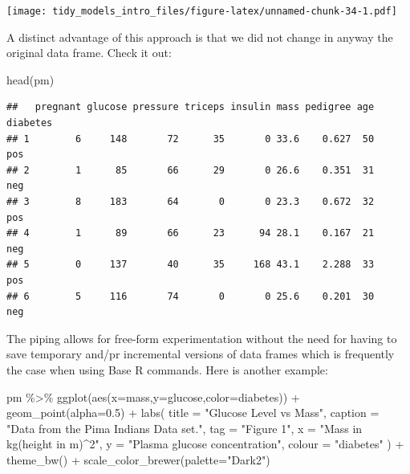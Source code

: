 \documentclass[
]{article}
\newenvironment{Shaded}{\begin{snugshade}}{\end{snugshade}}
\newcommand{\AttributeTok}[1]{\textcolor[rgb]{0.77,0.63,0.00}{#1}}
\newcommand{\FloatTok}[1]{\textcolor[rgb]{0.00,0.00,0.81}{#1}}
\newcommand{\FunctionTok}[1]{\textcolor[rgb]{0.00,0.00,0.00}{#1}}
\newcommand{\NormalTok}[1]{#1}
\newcommand{\SpecialCharTok}[1]{\textcolor[rgb]{0.00,0.00,0.00}{#1}}
\newcommand{\StringTok}[1]{\textcolor[rgb]{0.31,0.60,0.02}{#1}}
\begin{document}
\texttt{[image: tidy\_models\_intro\_files/figure-latex/unnamed-chunk-34-1.pdf]}

A distinct advantage of this approach is that we did not change in
anyway the original data frame. Check it out:

\begin{Shaded}
\begin{Highlighting}[]
\FunctionTok{head}\NormalTok{(pm)}
\end{Highlighting}
\end{Shaded}

\begin{verbatim}
##   pregnant glucose pressure triceps insulin mass pedigree age diabetes
## 1        6     148       72      35       0 33.6    0.627  50      pos
## 2        1      85       66      29       0 26.6    0.351  31      neg
## 3        8     183       64       0       0 23.3    0.672  32      pos
## 4        1      89       66      23      94 28.1    0.167  21      neg
## 5        0     137       40      35     168 43.1    2.288  33      pos
## 6        5     116       74       0       0 25.6    0.201  30      neg
\end{verbatim}

The piping allows for free-form experimentation without the need for
having to save temporary and/pr incremental versions of data frames
which is frequently the case when using Base R commands. Here is another
example:

\begin{Shaded}
\begin{Highlighting}[]
\NormalTok{pm }\SpecialCharTok{\%\textgreater{}\%}
  \FunctionTok{ggplot}\NormalTok{(}\FunctionTok{aes}\NormalTok{(}\AttributeTok{x=}\NormalTok{mass,}\AttributeTok{y=}\NormalTok{glucose,}\AttributeTok{color=}\NormalTok{diabetes)) }\SpecialCharTok{+} 
  \FunctionTok{geom\_point}\NormalTok{(}\AttributeTok{alpha=}\FloatTok{0.5}\NormalTok{) }\SpecialCharTok{+}
  \FunctionTok{labs}\NormalTok{(}
    \AttributeTok{title =} \StringTok{"Glucose Level vs Mass"}\NormalTok{,}
    \AttributeTok{caption =} \StringTok{"Data from the Pima Indians Data set."}\NormalTok{,}
    \AttributeTok{tag =} \StringTok{"Figure 1"}\NormalTok{,}
    \AttributeTok{x =} \StringTok{"Mass in kg(height in m)\^{}2"}\NormalTok{,}
    \AttributeTok{y =} \StringTok{"Plasma glucose concentration"}\NormalTok{,}
    \AttributeTok{colour =} \StringTok{"diabetes"}
\NormalTok{  ) }\SpecialCharTok{+} \FunctionTok{theme\_bw}\NormalTok{() }\SpecialCharTok{+} \FunctionTok{scale\_color\_brewer}\NormalTok{(}\AttributeTok{palette=}\StringTok{"Dark2"}\NormalTok{)}
\end{Highlighting}
\end{Shaded}
\end{document}

